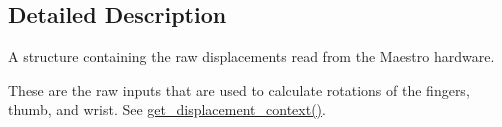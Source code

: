 \subsection{Detailed Description}
A structure containing the raw displacements read from the Maestro hardware. 

These are the raw inputs that are used to calculate rotations of the fingers, thumb, and wrist. See {\ttfamily \hyperlink{group__displacement_access_ga26563f1c104bd9a0d80ab8c0afd1e8bd}{get\+\_\+displacement\+\_\+context()}}. 